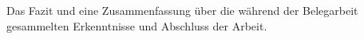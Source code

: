 Das Fazit und eine Zusammenfassung über die während der Belegarbeit gesammelten Erkenntnisse und Abschluss der Arbeit.